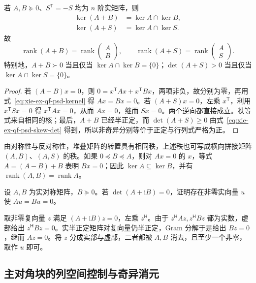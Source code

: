 \begin{proposition}
\label{prop:xie-ex-qf-kernel-sums}
若 $A,B\succeq0$、$S^{\mathsf T}=-S$ 均为 $n$ 阶实矩阵，则
\begin{align*}
 \ker(A+B)&=\ker A\cap\ker B,\\
 \ker(A+S)&=\ker A\cap\ker S.
\end{align*}
故
\[
 \operatorname{rank}(A+B)=\operatorname{rank}\begin{pmatrix}A\\B\end{pmatrix},
 \qquad
 \operatorname{rank}(A+S)=\operatorname{rank}\begin{pmatrix}A\\S\end{pmatrix}.
\]
特别地，$A+B\succ0$ 当且仅当 $\ker A\cap\ker B=\{0\}$；$\det(A+S)>0$ 当且仅当 $\ker A\cap\ker S=\{0\}$。
\end{proposition}
\begin{proof}
若 $(A+B)x=0$，则 $0=x^{\mathsf T}Ax+x^{\mathsf T}Bx$，两项非负，故分别为零，再用式~\eqref{eq:xie-ex-qf-psd-kernel} 得 $Ax=Bx=0$。若 $(A+S)x=0$，左乘 $x^{\mathsf T}$，利用 $x^{\mathsf T}Sx=0$ 得 $x^{\mathsf T}Ax=0$，从而 $Ax=0$，继而 $Sx=0$。两个逆向都直接成立。秩等式来自相同的核；最后，$A+B$ 已经半正定，而 $\det(A+S)\ge0$ 由式~\eqref{eq:xie-ex-qf-psd-skew-det} 得到，所以非奇异分别等价于正定与行列式严格为正。
\end{proof}

由对称性与反对称性，堆叠矩阵的转置具有相同秩，上述秩也可写成横向拼接矩阵 $(A,B)$、$(A,S)$ 的秩。如果 $0\preceq B\preceq A$，则对 $Ax=0$ 的 $x$，等式 $A=(A-B)+B$ 表明 $Bx=0$；因此 $\ker A\subseteq\ker B$，并有 $\operatorname{rank}(A,B)=\operatorname{rank}A$。

\begin{example}
设 $A,B$ 为实对称矩阵，$B\succeq0$。若 $\det(A+\mathrm iB)=0$，证明存在非零实向量 $u$ 使 $Au=Bu=0$。
\end{example}
\begin{solve}
取非零复向量 $z$ 满足 $(A+\mathrm iB)z=0$，左乘 $z^{\mathsf H}$。由于 $z^{\mathsf H}Az,z^{\mathsf H}Bz$ 都为实数，虚部给出 $z^{\mathsf H}Bz=0$。实半正定矩阵对复向量仍半正定，Gram 分解于是给出 $Bz=0$，继而 $Az=0$。将 $z$ 分成实部与虚部，二者都被 $A,B$ 消去，且至少一个非零，取作 $u$ 即可。
\end{solve}

\subsection{主对角块的列空间控制与奇异消元}

